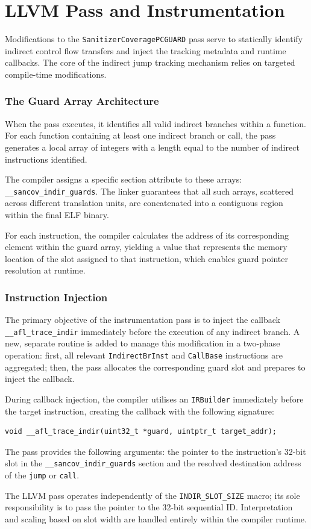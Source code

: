 \section{LLVM Pass and Instrumentation}

Modifications to the \texttt{SanitizerCoveragePCGUARD} pass serve to statically identify indirect control flow transfers and inject the tracking metadata and runtime callbacks. The core of the indirect jump tracking mechanism relies on targeted compile-time modifications.

\subsubsection{The Guard Array Architecture}

When the pass executes, it identifies all valid indirect branches within a function. For each function containing at least one indirect branch or call, the pass generates a local array of integers with a length equal to the number of indirect instructions identified.

The compiler assigns a specific section attribute to these arrays: \texttt{\_\_sancov\_indir\_guards}. The linker guarantees that all such arrays, scattered across different translation units, are concatenated into a contiguous region within the final ELF binary.

For each instruction, the compiler calculates the address of its corresponding element within the guard array, yielding a value that represents the memory location of the slot assigned to that instruction, which enables guard pointer resolution at runtime.

\subsubsection{Instruction Injection}

The primary objective of the instrumentation pass is to inject the callback \texttt{\_\_afl\_trace\_indir} immediately before the execution of any indirect branch. A new, separate routine is added to manage this modification in a two-phase operation: first, all relevant \texttt{IndirectBrInst} and \texttt{CallBase} instructions are aggregated; then, the pass allocates the corresponding guard slot and prepares to inject the callback.

During callback injection, the compiler utilises an \texttt{IRBuilder} immediately before the target instruction, creating the callback with the following signature:
\begin{verbatim}
void __afl_trace_indir(uint32_t *guard, uintptr_t target_addr);
\end{verbatim}

The pass provides the following arguments: the pointer to the instruction's 32-bit slot in the \texttt{\_\_sancov\_indir\_guards} section and the resolved destination address of the \texttt{jump} or \texttt{call}.

The LLVM pass operates independently of the \texttt{INDIR\_SLOT\_SIZE} macro; its sole responsibility is to pass the pointer to the 32-bit sequential ID. Interpretation and scaling based on slot width are handled entirely within the compiler runtime.